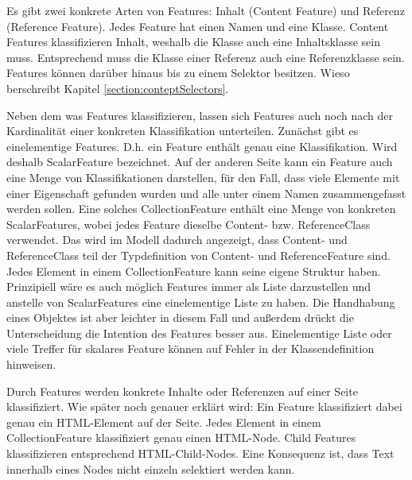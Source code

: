 
        Es gibt zwei konkrete Arten von Features: Inhalt (Content Feature) und Referenz (Reference Feature).
        Jedes Feature hat einen Namen und eine Klasse.
        Content Features klassifizieren Inhalt, weshalb die Klasse auch eine Inhaltsklasse sein muss.
        Entsprechend muss die Klasse einer Referenz auch eine Referenzklasse sein.
        Features können darüber hinaus bis zu einem Selektor besitzen.
        Wieso berschreibt Kapitel \ref{section:conteptSelectors}.
    
        Neben dem was Features klassifizieren, lassen sich Features auch noch nach der
        Kardinalität einer konkreten Klassifikation unterteilen.
        Zunächst gibt es einelementige Features.
        D.h. ein Feature enthält genau eine Klassifikation.
        Wird deshalb ScalarFeature bezeichnet.
        Auf der anderen Seite kann ein Feature auch eine Menge von Klassifikationen
        darstellen, für den Fall, dass viele Elemente mit einer Eigenschaft gefunden wurden
        und alle unter einem Namen zusammengefasst werden sollen.
        Eine solches CollectionFeature enthält eine Menge von konkreten ScalarFeatures,
        wobei jedes Feature dieselbe Content- bzw. ReferenceClass verwendet.
        Das wird im Modell dadurch angezeigt, dass Content- und ReferenceClass teil der Typdefinition
        von Content- und ReferenceFeature sind.
        Jedes Element in einem CollectionFeature kann seine eigene Struktur haben.
        Prinzipiell wäre es auch möglich Features immer als Liste darzustellen
        und anstelle von ScalarFeatures eine einelementige Liste zu haben.
        Die Handhabung eines Objektes ist aber leichter in diesem Fall und außerdem drückt
        die Unterscheidung die Intention des Features besser aus.
        Einelementige Liste oder viele Treffer für skalares Feature können auf Fehler in der
        Klassendefinition hinweisen.

        Durch Features werden konkrete Inhalte oder Referenzen auf einer Seite klassifiziert.
        Wie später noch genauer erklärt wird:
        Ein Feature klassifiziert dabei genau ein HTML-Element auf der Seite.
        Jedes Element in einem CollectionFeature klassifiziert genau einen HTML-Node.
        Child Features klassifizieren entsprechend HTML-Child-Nodes.
        Eine Konsequenz ist, dass Text innerhalb eines Nodes nicht einzeln selektiert werden kann.

